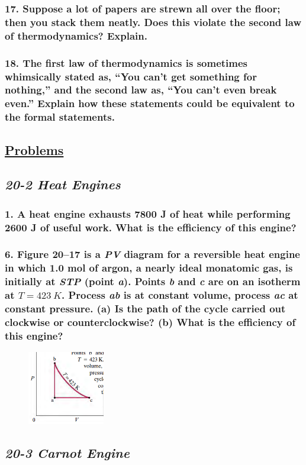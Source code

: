 \documentclass{article}
\begin{document}
\subsubsection*{
    17. Suppose a lot of papers are strewn all over the floor;
    then you stack them neatly. Does this violate the second law of thermodynamics? Explain.
}
\vspace{3in}
\subsubsection*{
    18. The first law of thermodynamics is sometimes whimsically stated as,
    “You can’t get something for nothing,” and the second law as,
    “You can’t even break even.” Explain how these statements could be equivalent to the formal statements.
}
\newpage
\begin{center}
    \section*{\textbf{\underline {Problems}}}
    \subsection*{\textbf{\textit{20-2 Heat Engines}}}
\end{center}
\subsubsection*{
    1. A heat engine exhausts 7800 J of heat while performing
    2600 J of useful work. What is the efficiency of this engine?
} 
\vspace{3in}
\subsubsection*{
    6. Figure 20–17 is a \textit{PV} diagram for a reversible heat
    engine in which 1.0 mol of argon, a nearly ideal
    monatomic gas, is initially at \textit{STP} (point \textit{a}).
    Points \textit{b} and \textit{c} are on an isotherm at $T = 423\:K$.
    Process \textit{ab} is at constant
    volume, process \textit{ac} at constant
    pressure. (\textbf{a}) Is the path of the
    cycle carried out clockwise or
    counterclockwise? (\textbf{b}) What is
    the efficiency of this engine?
}
\begin{figure}[h]
    \includegraphics[width=0.3\textwidth]{figures/20-17.png}
\end{figure}
\newpage
\begin{center}
    \subsection*{\textbf{\textit{20-3 Carnot Engine}}}
\end{center}
\end{document}

